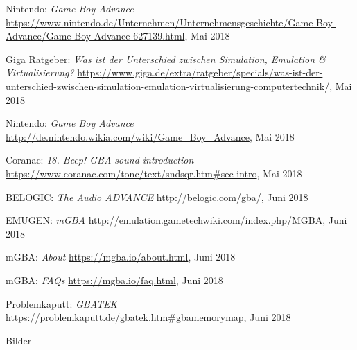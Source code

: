 \documentclass[11pt,a4paper]{scrartcl}
\begin{document}
\begin{thebibliography}{tiefe}
    Nintendo: \textit{Game Boy Advance}\newline
    \url{https://www.nintendo.de/Unternehmen/Unternehmensgeschichte/Game-Boy-Advance/Game-Boy-Advance-627139.html}, Mai 2018
    
    Giga Ratgeber: \textit{Was ist der Unterschied zwischen Simulation, Emulation \& Virtualisierung?}\newline
    \url{https://www.giga.de/extra/ratgeber/specials/was-ist-der-unterschied-zwischen-simulation-emulation-virtualisierung-computertechnik/}, Mai 2018
    
    Nintendo: \textit{Game Boy Advance}\newline
    \url{http://de.nintendo.wikia.com/wiki/Game_Boy_Advance}, Mai 2018
    
    Coranac: \textit{18. Beep! GBA sound introduction}\newline
    \url{https://www.coranac.com/tonc/text/sndsqr.htm#sec-intro}, Mai 2018
    
    BELOGIC: \textit{The Audio ADVANCE}\newline
    \url{http://belogic.com/gba/}, Juni 2018

    EMUGEN: \textit{mGBA}\newline
    \url{http://emulation.gametechwiki.com/index.php/MGBA}, Juni 2018

    mGBA: \textit{About}\newline
    \url{https://mgba.io/about.html}, Juni 2018

    mGBA: \textit{FAQs}\newline
    \url{https://mgba.io/faq.html}, Juni 2018

    Problemkaputt: \textit{GBATEK}\newline
    \url{https://problemkaputt.de/gbatek.htm#gbamemorymap}, Juni 2018
\end{thebibliography}

\vspace{1cm}

\huge Bilder
\normalsize
\end{document}
